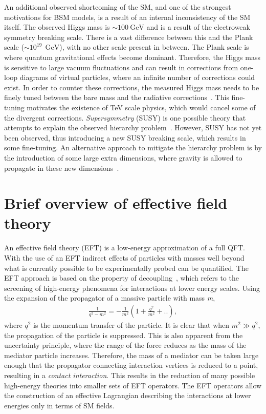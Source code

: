 An additional observed shortcoming of the SM, and one of the strongest motivations for BSM models, is a result of an internal inconsistency of the SM itself. The observed Higgs mass is $\sim \SI{100}{\giga\electronvolt}$ and is a result of the electroweak symmetry breaking scale. There is a vast difference between this and the Plank scale ($\sim 10^{19}~\SI{}{\giga\electronvolt}$), with no other scale present in between. The Plank scale is where quantum gravitational effects become dominant. Therefore, the Higgs mass is sensitive to large vacuum fluctuations and can result in corrections from one-loop diagrams of virtual particles, where an infinite number of corrections could exist. In order to counter these corrections, the measured Higgs mass needs to be finely tuned between the bare mass and the radiative corrections~\cite{Giudice_2008}. This fine-tuning motivates the existence of TeV scale physics, which would cancel some of the divergent corrections. \emph{Supersymmetry} (SUSY) is one possible theory that attempts to explain the observed hierarchy problem~\cite{MARTIN_1998}. However, SUSY has not yet been observed, thus introducing a new SUSY breaking scale, which results in some fine-tuning. An alternative approach to mitigate the hierarchy problem is by the introduction of some large extra dimensions, where gravity is allowed to propagate in these new dimensions~\cite{Arkani_Hamed_1998}. 

\section{Brief overview of effective field theory}\label{sec:bsm:eft}
An effective field theory (EFT) is a low-energy approximation of a full QFT. With the use of an EFT indirect effects of particles with masses well beyond what is currently possible to be experimentally probed can be quantified. The EFT approach is based on the property of decoupling~\cite{Manohar:2018aog}, which refers to the screening of high-energy phenomena for interactions at lower energy scales. Using the expansion of the propagator of a massive particle with mass \emph{m}, 
\begin{equation}
    \label{eq:propogator}
    \begin{aligned}
        \frac{1}{q^2 - m^2} = - \frac{1}{m^2}(1 + \frac{q^2}{m^2} + ..),
     \end{aligned}
\end{equation}
where $q^2$ is the momentum transfer of the particle. It is clear that when $m^2 \gg q^2$, the propagation of the particle is suppressed. This is also apparent from the uncertainty principle, where the range of the force reduces as the mass of the mediator particle increases. Therefore, the mass of a mediator can be taken large enough that the propagator connecting interaction vertices is reduced to a point, resulting in a \emph{contact interaction}. This results in the reduction of many possible high-energy theories into smaller sets of EFT operators. The EFT operators allow the construction of an effective Lagrangian describing the interactions at lower energies only in terms of SM fields. 

